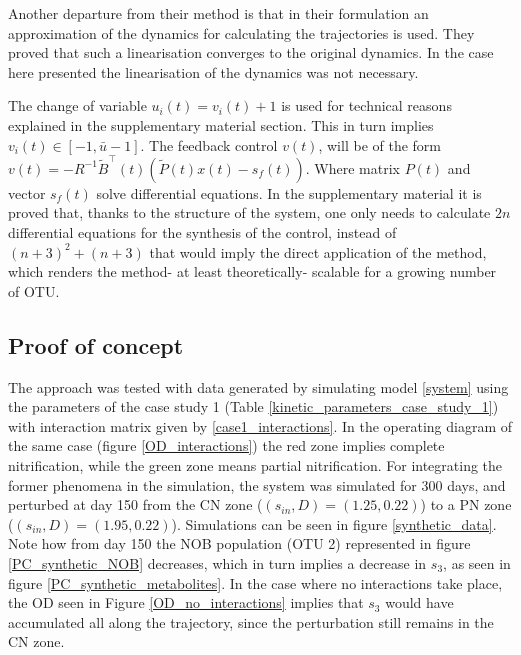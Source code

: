 \documentclass[3p,times]{article}
\begin{document}
Another departure from their method is that in their formulation an approximation of the dynamics for calculating the trajectories is used. They proved that such a linearisation converges to the original dynamics. In the case here presented the linearisation of the dynamics was not necessary.

The change of variable $u_i(t) = v_i(t) + 1$ is used for technical reasons explained in the supplementary material section. This in turn implies $v_i(t) \in [-1,\bar{u}-1]$. The feedback control $v(t)$, will be of the form $v(t) = -R^{-1}\tilde{B}^ \top(t)\left(\tilde{P}(t)x(t)-s_f(t)\right)$. Where matrix $P(t)$ and vector $s_f(t)$ solve differential equations. In the supplementary material it is proved that, thanks to the structure of the system, one only needs to calculate $2n$ differential equations for the synthesis of the control, instead of $(n+3)^2 + (n+3)$ that would imply the direct application of the method, which renders the method- at least theoretically- scalable for a growing number of OTU.

\subsection{Proof of concept}

The approach was tested with data generated by simulating model \eqref{system} using the parameters of the case study 1 (Table \ref{kinetic_parameters_case_study_1}) with interaction matrix given by \eqref{case1_interactions}. In the operating diagram of the same case (figure \eqref{OD_interactions}) the red zone implies complete nitrification, while the green zone means partial nitrification. For integrating the former phenomena in the simulation, the system was simulated for 300 days, and perturbed at day 150 from the CN zone ($(s_{in},D) = (1.25,0.22)$) to a PN zone ($(s_{in},D) = (1.95,0.22)$). Simulations can be seen in figure \ref{synthetic_data}. Note how from day 150 the NOB population (OTU 2) represented in figure \eqref{PC_synthetic_NOB} decreases, which in turn implies a decrease in $s_3$, as seen in figure \eqref{PC_synthetic_metabolites}. In the case where no interactions take place, the OD seen in Figure \ref{OD_no_interactions} implies that $s_3$ would have accumulated all along the trajectory, since the perturbation still remains in the CN zone.
\end{document}
